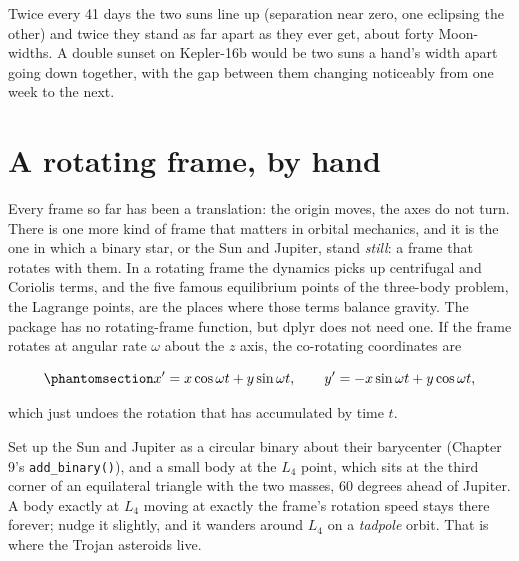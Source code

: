 \documentclass[
  10.5pt,
  letterpaper,
]{scrbook}
\theoremstyle{plain}
\theoremstyle{remark}
\begin{document}
Twice every 41 days the two suns line up (separation near zero, one
eclipsing the other) and twice they stand as far apart as they ever get,
about forty Moon-widths. A double sunset on Kepler-16b would be two suns
a hand's width apart going down together, with the gap between them
changing noticeably from one week to the next.

\section{A rotating frame, by hand}\label{a-rotating-frame-by-hand}

Every frame so far has been a translation: the origin moves, the axes do
not turn. There is one more kind of frame that matters in orbital
mechanics, and it is the one in which a binary star, or the Sun and
Jupiter, stand \emph{still}: a frame that rotates with them. In a
rotating frame the dynamics picks up centrifugal and Coriolis terms, and
the five famous equilibrium points of the three-body problem, the
Lagrange points, are the places where those terms balance gravity. The
package has no rotating-frame function, but dplyr does not need one. If
the frame rotates at angular rate \(\omega\) about the \(z\) axis, the
co-rotating coordinates are

\begin{equation}\protect\phantomsection\label{eq-corotating}{
x' = x\cos\omega t + y\sin\omega t, \qquad y' = -x\sin\omega t + y\cos\omega t,
}\end{equation}

which just undoes the rotation that has accumulated by time \(t\).

Set up the Sun and Jupiter as a circular binary about their barycenter
(Chapter 9's \texttt{add\_binary()}), and a small body at the \(L_4\)
point, which sits at the third corner of an equilateral triangle with
the two masses, 60 degrees ahead of Jupiter. A body exactly at \(L_4\)
moving at exactly the frame's rotation speed stays there forever; nudge
it slightly, and it wanders around \(L_4\) on a \emph{tadpole} orbit.
That is where the Trojan asteroids live.
\end{document}
